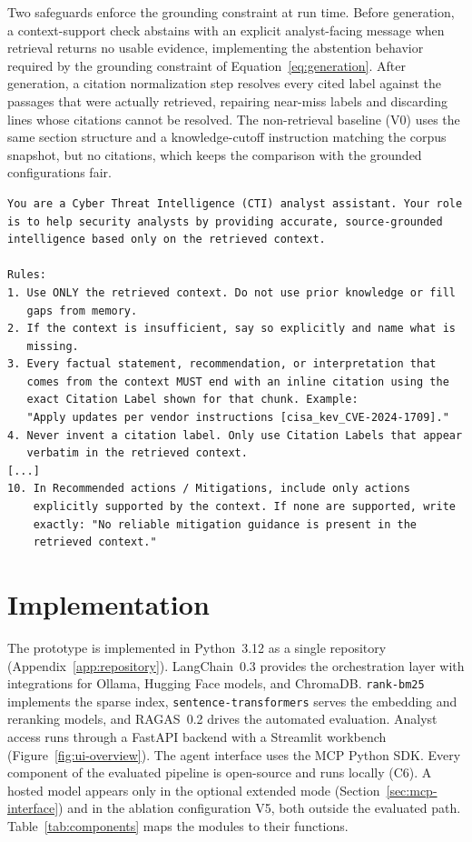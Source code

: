 Two safeguards enforce the grounding constraint at run time. Before
generation, a context-support check
abstains with an explicit analyst-facing message when retrieval returns
no usable evidence, implementing the abstention behavior required by the
grounding constraint of Equation~\ref{eq:generation}. After generation, a
citation normalization step resolves every cited label against the
passages that were actually retrieved, repairing near-miss labels and
discarding lines whose citations cannot be resolved. The non-retrieval
baseline (V0) uses the same section structure and a knowledge-cutoff
instruction matching the corpus snapshot, but no citations, which keeps
the comparison with the grounded configurations fair.

\begin{lstlisting}[caption={System prompt with citation instruction
                   (excerpt; full version in Appendix~\ref{app:prompts})},
                   label={lst:system-prompt}]
You are a Cyber Threat Intelligence (CTI) analyst assistant. Your role
is to help security analysts by providing accurate, source-grounded
intelligence based only on the retrieved context.

Rules:
1. Use ONLY the retrieved context. Do not use prior knowledge or fill
   gaps from memory.
2. If the context is insufficient, say so explicitly and name what is
   missing.
3. Every factual statement, recommendation, or interpretation that
   comes from the context MUST end with an inline citation using the
   exact Citation Label shown for that chunk. Example:
   "Apply updates per vendor instructions [cisa_kev_CVE-2024-1709]."
4. Never invent a citation label. Only use Citation Labels that appear
   verbatim in the retrieved context.
[...]
10. In Recommended actions / Mitigations, include only actions
    explicitly supported by the context. If none are supported, write
    exactly: "No reliable mitigation guidance is present in the
    retrieved context."
\end{lstlisting}

\section{Implementation}
\label{sec:implementation}

The prototype is implemented in Python~3.12 as a single repository
(Appendix~\ref{app:repository}). LangChain~0.3 provides the orchestration
layer with integrations for Ollama, Hugging Face models, and ChromaDB.
\texttt{rank-bm25} implements the sparse index,
\texttt{sentence-transformers} serves the embedding and reranking models,
and RAGAS~0.2 drives the automated evaluation. Analyst access runs
through a FastAPI backend with a Streamlit workbench
(Figure~\ref{fig:ui-overview}). The agent interface
uses the MCP Python SDK. Every component of the evaluated pipeline is
open-source and runs locally (C6). A hosted model appears only in the
optional extended mode (Section~\ref{sec:mcp-interface}) and in the
ablation configuration V5, both outside the evaluated path.
Table~\ref{tab:components} maps the modules to their functions.


